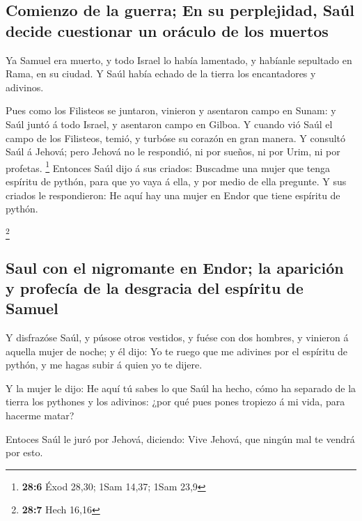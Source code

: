 \hypertarget{comienzo-de-la-guerra-en-su-perplejidad-sauxfal-decide-cuestionar-un-oruxe1culo-de-los-muertos}{%
\subsection{Comienzo de la guerra; En su perplejidad, Saúl decide
cuestionar un oráculo de los
muertos}\label{comienzo-de-la-guerra-en-su-perplejidad-sauxfal-decide-cuestionar-un-oruxe1culo-de-los-muertos}}

 Ya Samuel era muerto, y todo Israel lo había lamentado, y
habíanle sepultado en Rama, en su ciudad. Y Saúl había echado de la
tierra los encantadores y adivinos.

 Pues como los Filisteos se juntaron, vinieron y asentaron
campo en Sunam: y Saúl juntó á todo Israel, y asentaron campo en Gilboa.
 Y cuando vió Saúl el campo de los Filisteos, temió, y
turbóse su corazón en gran manera.  Y consultó Saúl á
Jehová; pero Jehová no le respondió, ni por sueños, ni por Urim, ni por
profetas. \footnote{\textbf{28:6} Éxod 28,30; 1Sam 14,37; 1Sam 23,9}
 Entonces Saúl dijo á sus criados: Buscadme una mujer que
tenga espíritu de pythón, para que yo vaya á ella, y por medio de ella
pregunte. Y sus criados le respondieron: He aquí hay una mujer en Endor
que tiene espíritu de pythón.

\footnote{\textbf{28:7} Hech 16,16}

\hypertarget{saul-con-el-nigromante-en-endor-la-apariciuxf3n-y-profecuxeda-de-la-desgracia-del-espuxedritu-de-samuel}{%
\subsection{Saul con el nigromante en Endor; la aparición y profecía de
la desgracia del espíritu de
Samuel}\label{saul-con-el-nigromante-en-endor-la-apariciuxf3n-y-profecuxeda-de-la-desgracia-del-espuxedritu-de-samuel}}

 Y disfrazóse Saúl, y púsose otros vestidos, y fuése con
dos hombres, y vinieron á aquella mujer de noche; y él dijo: Yo te ruego
que me adivines por el espíritu de pythón, y me hagas subir á quien yo
te dijere.

 Y la mujer le dijo: He aquí tú sabes lo que Saúl ha
hecho, cómo ha separado de la tierra los pythones y los adivinos: ¿por
qué pues pones tropiezo á mi vida, para hacerme matar?

 Entoces Saúl le juró por Jehová, diciendo: Vive Jehová,
que ningún mal te vendrá por esto.

